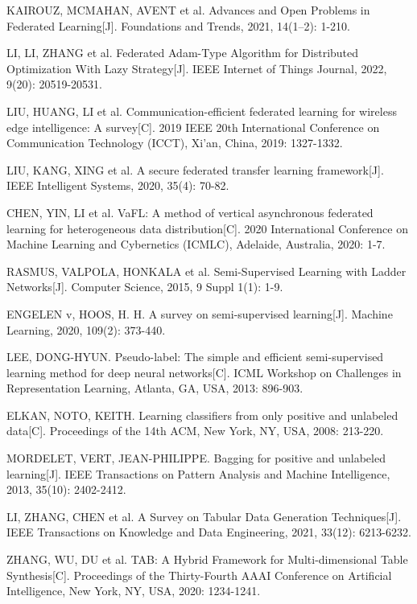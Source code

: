 \begin{thebibliography}{200}
	KAIROUZ, MCMAHAN, AVENT et al. Advances and Open Problems in Federated Learning[J]. Foundations and Trends\textregistered, 2021, 14(1--2): 1-210.
	
	LI, LI, ZHANG et al. Federated Adam-Type Algorithm for Distributed Optimization With Lazy Strategy[J]. IEEE Internet of Things Journal, 2022, 9(20): 20519-20531.
	
	LIU, HUANG, LI et al. Communication-efficient federated learning for wireless edge intelligence: A survey[C]. 2019 IEEE 20th International Conference on Communication Technology (ICCT), Xi'an, China, 2019: 1327-1332.
	
	LIU, KANG, XING et al. A secure federated transfer learning framework[J]. IEEE Intelligent Systems, 2020, 35(4): 70-82.
	
	CHEN, YIN, LI et al. VaFL: A method of vertical asynchronous federated learning for heterogeneous data distribution[C]. 2020 International Conference on Machine Learning and Cybernetics (ICMLC), Adelaide, Australia, 2020: 1-7.
	
	RASMUS, VALPOLA, HONKALA et al. Semi-Supervised Learning with Ladder Networks[J]. Computer Science, 2015, 9 Suppl 1(1): 1-9.
	
	ENGELEN v, HOOS, H. H. A survey on semi-supervised learning[J]. Machine Learning, 2020, 109(2): 373-440.
	
	LEE, DONG-HYUN. Pseudo-label: The simple and efficient semi-supervised learning method for deep neural networks[C]. ICML Workshop on Challenges in Representation Learning, Atlanta, GA, USA, 2013: 896-903.
	
	ELKAN, NOTO, KEITH. Learning classifiers from only positive and unlabeled data[C]. Proceedings of the 14th ACM, New York, NY, USA, 2008: 213-220.
	
	MORDELET, VERT, JEAN-PHILIPPE. Bagging for positive and unlabeled learning[J]. IEEE Transactions on Pattern Analysis and Machine Intelligence, 2013, 35(10): 2402-2412.
	
	LI, ZHANG, CHEN et al. A Survey on Tabular Data Generation Techniques[J]. IEEE Transactions on Knowledge and Data Engineering, 2021, 33(12): 6213-6232.
	
	ZHANG, WU, DU et al. TAB: A Hybrid Framework for Multi-dimensional Table Synthesis[C]. Proceedings of the Thirty-Fourth AAAI Conference on Artificial Intelligence, New York, NY, USA, 2020: 1234-1241.
	

\end{thebibliography}
